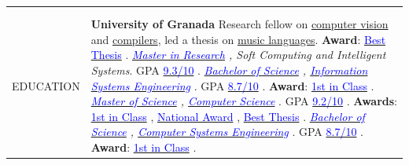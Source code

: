 \documentclass[letterpaper,10pt,oneside]{article}
\newcommand{\DatestampY}[1]{#1}
\newcommand{\sref}[2]{%
    \href{https://0/local/attachments/#1}{\textcolor{blue}{#2}}%
}
\newenvironment{body}
{\par\par
\begin{longtable}{p{0.145\textwidth}p{0.81\textwidth}}
\endfirsthead
\noalign{\vspace{0.4cm}}
\endhead}
{\par\end{longtable}\par}
\renewcommand{\section}[3]{\\[-0.28cm]\pdfbookmark[2]{#2}{#3}\\%
\raggedleft  %
{\fontsize{9.5pt}{9.5pt}\selectfont\bfseries\raggedright%
\MakeUppercase{#1}}&}
\begin{document}
\begin{body}
\section{Education}{Education}{PDF:Education}
\textbf{University of Granada} \newline %
\phantom{g}Research fellow on \href{https://doi.org/10.1142/S0129065712500190}{computer vision} and \href{https://doi.org/10.1142/S0218194014500375}{compilers}, led a thesis on \href{https://github.com/lquesada/ADAgio}{music languages}. \textbf{Award}: \sref{UGR-Award-BestMasterThesis-MusicPrototyping.pdf}{Best Thesis}.\vspace{0.06cm}\newline
\phantom{g}\textit{\sref{MRes-SoftComputingArtificialIntelligence-Diploma.pdf}{Master in Research}, Soft Computing and Intelligent Systems}. GPA \sref{MRes-SoftComputingArtificialIntelligence-Transcript-Spanish.pdf}{9.3/10}.\vspace{0.06cm}\newline
\phantom{g}\textit{\sref{BSc-ManagementInformationTechnology-Diploma.pdf}{Bachelor of Science}, \sref{BSc-ManagementInformationTechnology-Transcript.pdf}{Information Systems Engineering}}. GPA \sref{BSc-ManagementInformationTechnology-Transcript-Spanish.pdf}{8.7/10}. \textbf{Award}: \sref{BSc-ManagementInformationTechnology-Award-FirstOfPromotion.pdf}{1st in Class}.\vspace{0.06cm}\newline
\phantom{g}\textit{\sref{MSc-ComputerEngineering-Diploma.pdf}{Master of Science}, \sref{MSc-ComputerEngineering-Transcript.pdf}{Computer Science}}. GPA \sref{MSc-ComputerEngineering-Transcript-Spanish.pdf}{9.2/10}. \textbf{Awards}: \sref{MSc-ComputerEngineering-Award-FirstOfPromotion.pdf}{1st in Class}, \sref{MSc-ComputerEngineering-Award-NationalAward.pdf}{National Award}, \sref{MSc-ComputerEngineering-Award-BestMasterThesis.pdf}{Best Thesis}.\vspace{0.06cm}\newline
\phantom{g}\textit{\sref{BSc-SystemInformationTechnology-Diploma.pdf}{Bachelor of Science}, \sref{BSc-SystemInformationTechnology-Transcript.pdf}{Computer Systems Engineering}}. GPA \sref{BSc-SystemInformationTechnology-Transcript-Spanish.pdf}{8.7/10}. \textbf{Award}: \sref{BSc-SystemInformationTechnology-Award-FirstOfPromotion.pdf}{1st in Class}.


\end{body}
\end{document}
